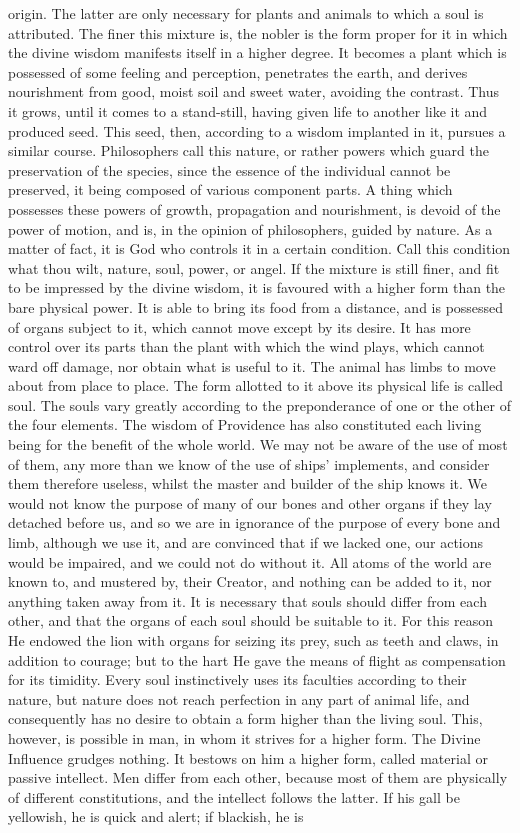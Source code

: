\documentclass[12pt]{article}
\begin{document}
origin. The latter are only necessary for plants and animals to which a soul is attributed. The finer this mixture is, the nobler is the form proper for it in which the divine wisdom manifests itself in a higher degree. It becomes a plant which is possessed of some feeling and perception, penetrates the earth, and derives nourishment from good, moist soil and sweet water, avoiding the contrast. Thus it grows, until it comes to a stand-still, having given life to another like it and produced seed. This seed, then, according to a wisdom implanted in it, pursues a similar course. Philosophers call this nature, or rather powers which guard the preservation of the species, since the essence of the individual cannot be preserved, it being composed of various component parts. A thing which possesses these powers of growth, propagation and nourishment, is devoid of the power of motion, and is, in the opinion of philosophers, guided by nature. As a matter of fact, it is God who controls it in a certain condition. Call this condition what thou wilt, nature, soul, power, or angel. If the mixture is still finer, and fit to be impressed by the divine wisdom, it is favoured with a higher form than the bare physical power. It is able to bring its food from a distance, and is possessed of organs subject to it, which cannot move except by its desire. It has more control over its parts than the plant with which the wind plays, which cannot ward off damage, nor obtain what is useful to it. The animal has limbs to move about from place to place. The form allotted to it above its physical life is called soul. The souls vary greatly according to the preponderance of one or the other of the four elements. The wisdom of Providence has also constituted each living being for the benefit of the whole world. We may not be aware of the use of most of them, any more than we know of the use of ships' implements, and consider them therefore useless, whilst the master and builder of the ship knows it. We would not know the purpose of many of our bones and other organs if they lay detached before us, and so we are in ignorance of the purpose of every bone and limb, although we use it, and are convinced that if we lacked one, our actions would be impaired, and we could not do without it. All atoms of the world are known to, and mustered by, their Creator, and nothing can be added to it, nor anything taken away from it. It is necessary that souls should differ from each other, and that the organs of each soul should be suitable to it. For this reason He endowed the lion with organs for seizing its prey, such as teeth and claws, in addition to courage; but to the hart He gave the means of flight as compensation for its timidity. Every soul instinctively uses its faculties according to their nature, but nature does not reach perfection in any part of animal life, and consequently has no desire to obtain a form higher than the living soul. This, however, is possible in man, in whom it strives for a higher form. The Divine Influence grudges nothing. It bestows on him a higher form, called material or passive intellect. Men differ from each other, because most of them are physically of different constitutions, and the intellect follows the latter. If his gall be yellowish, he is quick and alert; if blackish, he is 
\end{document}
